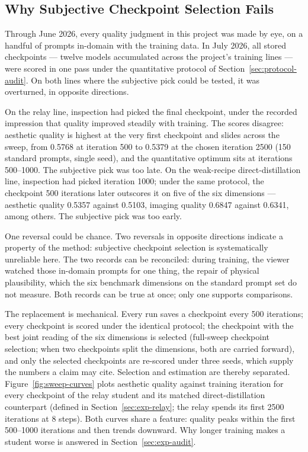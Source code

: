 \documentclass[11pt,a4paper]{article}
\begin{document}
\subsection{Why Subjective Checkpoint Selection Fails}\label{sec:protocol-subjective}

Through June 2026, every quality judgment in this project was made by eye, on a handful of prompts in-domain with the training data. In July 2026, all stored checkpoints — twelve models accumulated across the project's training lines — were scored in one pass under the quantitative protocol of Section~\ref{sec:protocol-audit}. On both lines where the subjective pick could be tested, it was overturned, in opposite directions.

On the relay line, inspection had picked the final checkpoint, under the recorded impression that quality improved steadily with training. The scores disagree: aesthetic quality is highest at the very first checkpoint and slides across the sweep, from 0.5768 at iteration 500 to 0.5379 at the chosen iteration 2500 (150 standard prompts, single seed), and the quantitative optimum sits at iterations 500–1000. The subjective pick was too late. On the weak-recipe direct-distillation line, inspection had picked iteration 1000; under the same protocol, the checkpoint 500 iterations later outscores it on five of the six dimensions — aesthetic quality 0.5357 against 0.5103, imaging quality 0.6847 against 0.6341, among others. The subjective pick was too early.

One reversal could be chance. Two reversals in opposite directions indicate a property of the method: subjective checkpoint selection is systematically unreliable here. The two records can be reconciled: during training, the viewer watched those in-domain prompts for one thing, the repair of physical plausibility, which the six benchmark dimensions on the standard prompt set do not measure. Both records can be true at once; only one supports comparisons.

The replacement is mechanical. Every run saves a checkpoint every 500 iterations; every checkpoint is scored under the identical protocol; the checkpoint with the best joint reading of the six dimensions is selected (full-sweep checkpoint selection; when two checkpoints split the dimensions, both are carried forward), and only the selected checkpoints are re-scored under three seeds, which supply the numbers a claim may cite. Selection and estimation are thereby separated. Figure~\ref{fig:sweep-curves} plots aesthetic quality against training iteration for every checkpoint of the relay student and its matched direct-distillation counterpart (defined in Section~\ref{sec:exp-relay}; the relay spends its first 2500 iterations at 8 steps). Both curves share a feature: quality peaks within the first 500–1000 iterations and then trends downward. Why longer training makes a student worse is answered in Section~\ref{sec:exp-audit}.
\end{document}
